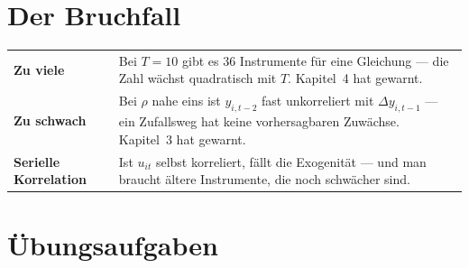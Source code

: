 \section{Der Bruchfall}

\begin{warnung}
\begin{center}
{\small
\renewcommand{\arraystretch}{1.52}
\begin{tabular}{@{}P{2.8cm}P{5.8cm}@{}}
\toprule
\textbf{Zu viele} & Bei $T = 10$ gibt es $36$ Instrumente für eine Gleichung --- die Zahl wächst quadratisch mit $T$. Kapitel~4 hat gewarnt.\\
\textbf{Zu schwach} & Bei $\rho$ nahe eins ist $y_{i,t-2}$ fast unkorreliert mit $\Delta y_{i,t-1}$ --- ein Zufallsweg hat keine vorhersagbaren Zuwächse. Kapitel~3 hat gewarnt.\\
\textbf{Serielle Korrelation} & Ist $u_{it}$ selbst korreliert, fällt die Exogenität --- und man braucht ältere Instrumente, die noch schwächer sind.\\
\bottomrule
\end{tabular}}
\end{center}

\begin{center}
\begin{minipage}{0.88\textwidth}
\end{minipage}
\end{center}
\end{warnung}

\section{Übungsaufgaben}

